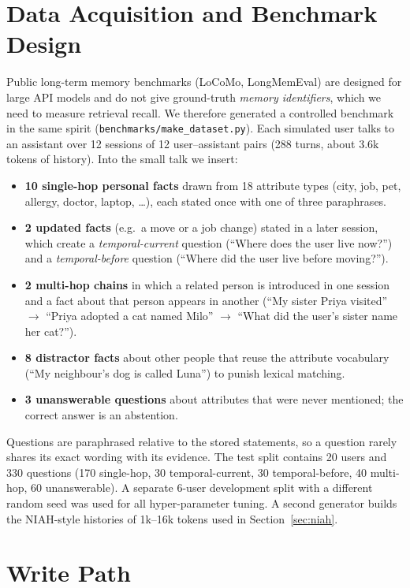 \section{Data Acquisition and Benchmark Design}
\label{sec:data}
Public long-term memory benchmarks (LoCoMo, LongMemEval) are designed for large API models and do not give
ground-truth \emph{memory identifiers}, which we need to measure retrieval recall. We therefore generated a
controlled benchmark in the same spirit (\texttt{benchmarks/make\_dataset.py}). Each simulated user talks
to an assistant over 12 sessions of 12 user--assistant pairs (288 turns, about 3.6k tokens of history).
Into the small talk we insert:
\begin{itemize}[nosep]
  \item \textbf{10 single-hop personal facts} drawn from 18 attribute types (city, job, pet, allergy, doctor,
        laptop, \dots), each stated once with one of three paraphrases.
  \item \textbf{2 updated facts} (e.g.\ a move or a job change) stated in a later session, which create a
        \emph{temporal-current} question (``Where does the user live now?'') and a \emph{temporal-before}
        question (``Where did the user live before moving?'').
  \item \textbf{2 multi-hop chains} in which a related person is introduced in one session and a fact about
        that person appears in another (``My sister Priya visited'' $\rightarrow$ ``Priya adopted a cat named
        Milo'' $\rightarrow$ ``What did the user's sister name her cat?'').
  \item \textbf{8 distractor facts} about other people that reuse the attribute vocabulary (``My neighbour's
        dog is called Luna'') to punish lexical matching.
  \item \textbf{3 unanswerable questions} about attributes that were never mentioned; the correct answer is
        an abstention.
\end{itemize}
Questions are paraphrased relative to the stored statements, so a question rarely shares its exact wording
with its evidence. The test split contains 20 users and 330 questions (170 single-hop, 30 temporal-current,
30 temporal-before, 40 multi-hop, 60 unanswerable). A separate 6-user development split with a different
random seed was used for all hyper-parameter tuning. A second generator builds the NIAH-style histories of
1k--16k tokens used in Section~\ref{sec:niah}.

\section{Write Path}
